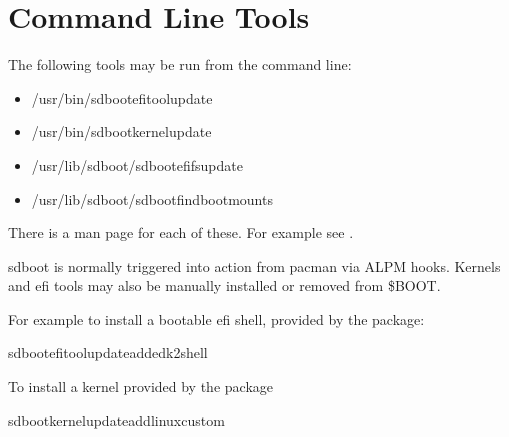\documentclass[letterpaper,11pt,english]{sphinxmanual}
\begin{document}
\section{Command Line Tools}
\label{\detokenize{Configuration:command-line-tools}}
\sphinxAtStartPar
The following tools may be run from the command line:
\begin{itemize}
\item {} 
\sphinxAtStartPar
/usr/bin/sd\sphinxhyphen{}boot\sphinxhyphen{}efi\sphinxhyphen{}tool\sphinxhyphen{}update

\item {} 
\sphinxAtStartPar
/usr/bin/sd\sphinxhyphen{}boot\sphinxhyphen{}kernel\sphinxhyphen{}update

\item {} 
\sphinxAtStartPar
/usr/lib/sd\sphinxhyphen{}boot/sd\sphinxhyphen{}boot\sphinxhyphen{}efifs\sphinxhyphen{}update

\item {} 
\sphinxAtStartPar
/usr/lib/sd\sphinxhyphen{}boot/sd\sphinxhyphen{}boot\sphinxhyphen{}find\sphinxhyphen{}boot\sphinxhyphen{}mounts

\end{itemize}

\sphinxAtStartPar
There is a man page for each of these. For example see .

\sphinxAtStartPar
sd\sphinxhyphen{}boot is normally triggered into action from pacman via ALPM hooks. Kernels and efi tools
may also be manually installed or removed from \$BOOT.

\sphinxAtStartPar
For example to install a bootable efi shell, provided by the  package:

\begin{sphinxVerbatim}[commandchars=\\\{\}]
sd\PYGZhy{}boot\PYGZhy{}efi\PYGZhy{}tool\PYGZhy{}updateaddedk2\PYGZhy{}shell
\end{sphinxVerbatim}

\sphinxAtStartPar
To install a kernel provided by the  package

\begin{sphinxVerbatim}[commandchars=\\\{\}]
sd\PYGZhy{}boot\PYGZhy{}kernel\PYGZhy{}updateaddlinux\PYGZhy{}custom
\end{sphinxVerbatim}
\end{document}
